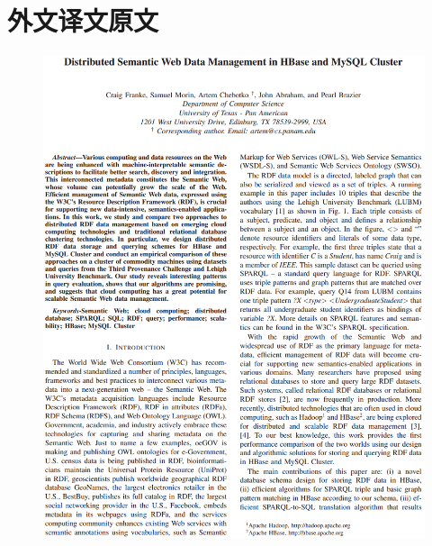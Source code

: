 \newpage
\section*{外文译文原文}

\begin{figure}[!ht]
\includegraphics[scale=0.67]{photo/yingyu1.png}
\end{figure} 

